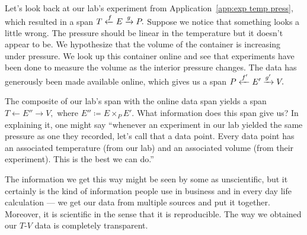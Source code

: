 \documentclass[../main/CT4S-EN-RU]{subfiles}
\begin{document}
\begin{applicationENG}\label{app:exp temp press 2}
Let's look back at our lab's experiment from Application~\ref{app:exp temp press}, which resulted in a span $T\xleftarrow{f}E\xrightarrow{g}P.$ Suppose we notice that something looks a little wrong. The pressure should be linear in the temperature but it doesn't appear to be. We hypothesize that the volume of the container is increasing under pressure. We look up this container online and see that experiments have been done to measure the volume as the interior pressure changes. The data has generously been made available online, which gives us a span $P\xleftarrow{f'}E'\xrightarrow{g'}V.$ 

The composite of our lab's span with the online data span yields a span $T{←} E''{→} V,$ where $E''{\coloneqq}E\times_PE'.$ What information does this span give us? In explaining it, one might say “whenever an experiment in our lab yielded the same pressure as one they recorded, let's call that a data point. Every data point has an associated temperature (from our lab) and an associated volume (from their experiment). This is the best we can do.” 

The information we get this way might be seen by some as unscientific, but it certainly is the kind of information people use in business and in every day life calculation — we get our data from multiple sources and put it together. Moreover, it is scientific in the sense that it is reproducible. The way we obtained our $T$-$V$ data is completely transparent.
\end{applicationENG}
\end{document}
